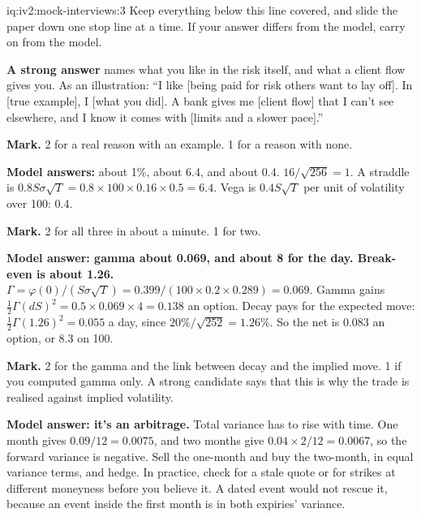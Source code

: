 \begin{solution}{iq:iv2:mock-interviews:3}
Keep everything below this line covered, and slide the paper down one stop line at a time. If your answer differs from the model, carry on from the model.

\ivstop
\textbf{A strong answer} names what you like in the risk itself, and what a client flow gives you. As an illustration: ``I like [being paid for risk others want to lay off]. In [true example], I [what you did]. A bank gives me [client flow] that I can't see elsewhere, and I know it comes with [limits and a slower pace].''

\textbf{Mark.} 2 for a real reason with an example. 1 for a reason with none.

\ivstop
\textbf{Model answers:} about 1\%, about 6.4, and about 0.4. $16/\sqrt{256} = 1$. A straddle is $0.8 S\sigma\sqrt{T} = 0.8 \times 100 \times 0.16 \times 0.5 = 6.4$. Vega is $0.4 S\sqrt{T}$ per unit of volatility over 100: 0.4.

\textbf{Mark.} 2 for all three in about a minute. 1 for two.

\ivstop
\textbf{Model answer: gamma about 0.069, and about 8 for the day. Break-even is about 1.26.} $\Gamma = \varphi(0)/(S\sigma\sqrt{T}) = 0.399/(100 \times 0.2 \times 0.289) = 0.069$. Gamma gains $\tfrac12\Gamma(dS)^2 = 0.5 \times 0.069 \times 4 = 0.138$ an option. Decay pays for the expected move: $\tfrac12\Gamma(1.26)^2 = 0.055$ a day, since $20\%/\sqrt{252} = 1.26\%$. So the net is 0.083 an option, or 8.3 on 100.

\textbf{Mark.} 2 for the gamma and the link between decay and the implied move. 1 if you computed gamma only. A strong candidate says that this is why the trade is realised against implied volatility.

\ivstop
\textbf{Model answer: it's an arbitrage.} Total variance has to rise with time. One month gives $0.09/12 = 0.0075$, and two months give $0.04 \times 2/12 = 0.0067$, so the forward variance is negative. Sell the one-month and buy the two-month, in equal variance terms, and hedge. In practice, check for a stale quote or for strikes at different moneyness before you believe it. A dated event would not rescue it, because an event inside the first month is in both expiries' variance.


\end{solution}
